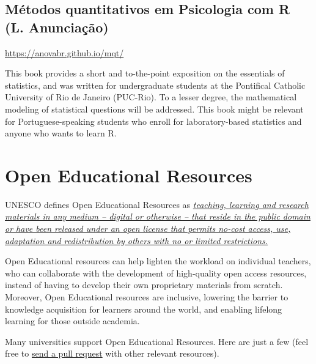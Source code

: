 \documentclass[
]{book}
\begin{document}
\hypertarget{muxe9todos-quantitativos-em-psicologia-com-r-l.-anunciauxe7uxe3o}{%
\section{Métodos quantitativos em Psicologia com R (L. Anunciação)}\label{muxe9todos-quantitativos-em-psicologia-com-r-l.-anunciauxe7uxe3o}}

\url{https://anovabr.github.io/mqt/}

This book provides a short and to-the-point exposition on the essentials of statistics, and was written for undergraduate students at the Pontifical Catholic University of Rio de Janeiro (PUC-Rio). To a lesser degree, the mathematical modeling of statistical questions will be addressed. This book might be relevant for Portuguese-speaking students who enroll for laboratory-based statistics and anyone who wants to learn R.

\hypertarget{open-educational-resources}{%
\chapter{Open Educational Resources}\label{open-educational-resources}}

UNESCO defines Open Educational Resources as \href{https://en.unesco.org/themes/building-knowledge-societies/oer}{\emph{teaching, learning and research materials in any medium -- digital or otherwise -- that reside in the public domain or have been released under an open license that permits no-cost access, use, adaptation and redistribution by others with no or limited restrictions.}}

Open Educational resources can help lighten the workload on individual teachers, who can collaborate with the development of high-quality open access resources, instead of having to develop their own proprietary materials from scratch. Moreover, Open Educational resources are inclusive, lowering the barrier to knowledge acquisition for learners around the world, and enabling lifelong learning for those outside academia.

Many universities support Open Educational Resources. Here are just a few (feel free to \href{https://help.github.com/en/github/collaborating-with-issues-and-pull-requests/creating-a-pull-request}{send a pull request} with other relevant resources).
\end{document}
